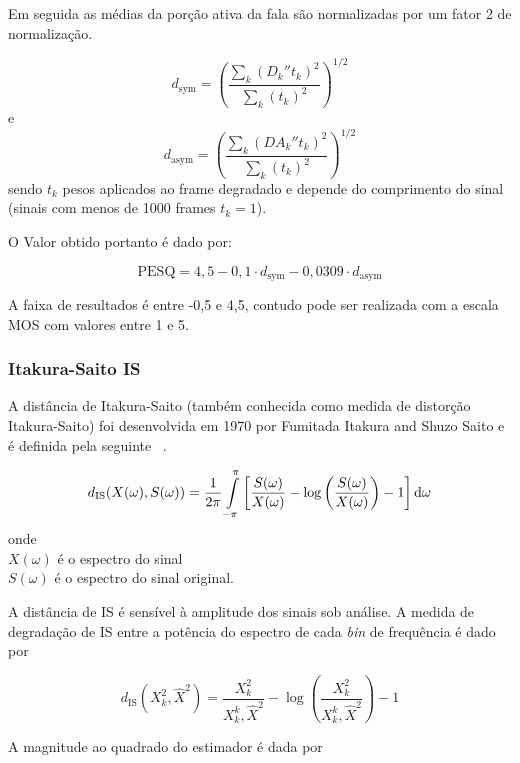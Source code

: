 Em seguida as médias da porção ativa da fala são normalizadas por um fator 2 de normalização.

\begin{equation}
d_{\text{sym}} = \left(\dfrac{\sum_k(D_k''t_k)^2}{\sum_k(t_k)^2}\right)^{1/2}
\end{equation}
e
\begin{equation}
d_{\text{asym}} = \left(\dfrac{\sum_k(DA_k''t_k)^2}{\sum_k(t_k)^2}\right)^{1/2}
\end{equation}
sendo
$t_k$ pesos aplicados ao frame degradado e depende do comprimento do sinal (sinais com menos de 1000 frames $t_k=1$).

O Valor obtido portanto é dado por:

\begin{equation}
\text{PESQ} = 4,5 - 0,1\cdot d_{\text{sym}} -0,0309\cdot d_\text{asym}
\end{equation}

A faixa de resultados é entre -0,5 e 4,5, contudo pode ser realizada com a escala MOS com valores entre 1 e 5.

\subsubsection{Itakura-Saito IS}
A distância de Itakura-Saito (também conhecida como medida de
distorção Itakura-Saito) foi desenvolvida em 1970 por Fumitada Itakura and Shuzo Saito e é definida pela seguinte ~\cite{eduardo2009}.

\begin{equation}
d_{\text{IS}}(X(\omega),S(\omega)) = \dfrac{1}{2\pi} \int\limits_{-\pi}^\pi\left[\dfrac{S(\omega)}{X(\omega)}-\log\left(\dfrac{S(\omega)}{X(\omega)}\right)-1\right]\operatorname{d\!} \omega
\label{eqis}
\end{equation}
\noindent
onde\\
$X(\omega)$ é o espectro do sinal\\ 
$S(\omega)$ é o espectro do sinal original. 

A distância de IS é sensível à amplitude dos sinais sob análise. A medida de degradação de IS entre a potência do espectro de cada \textit{bin} de frequência é dado por

\begin{equation}
d_{\text{IS}}(X_k^2,\hat{X}^2) = \dfrac{X_k^2}{X_k^k,\hat{X}^2} - \log\left( \dfrac{X_k^2}{X_k^k,\hat{X}^2}\right)-1
\end{equation}

A magnitude ao quadrado do estimador é dada por

